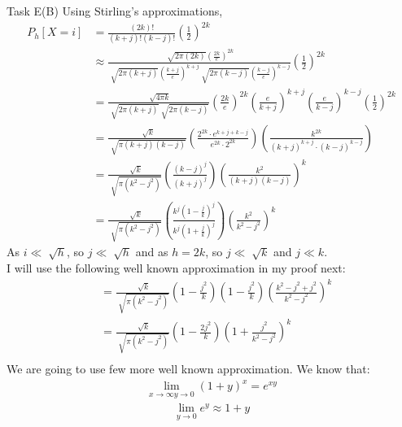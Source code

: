 \begin{task}{Task E(B)}
	Using Stirling's approximations,
	\begin{align}
		P_h[X=i] & = \frac{(2k)!}{(k+j)!(k-j)!}\left(\frac{1}{2}\right)^{2k} \\
		         & \approx
		\frac{\sqrt[]{2\pi(2k)}\left(\frac{2k}{e}\right)^{2k}}{\sqrt[]{2\pi(k+j)}\left(\frac{k+j}{e}\right)^{k+j}\sqrt[]{2\pi(k-j)}\left(\frac{k-j}{e}\right)^{k-j}}\left(\frac{1}{2}\right)^{2k}
		\\
		         & = \frac{\sqrt[]{4\pi k}}{\sqrt[]{2\pi
				(k+j)}\sqrt[]{2\pi (k-j)}}
		\left(\frac{2k}{e}\right)^{2k}\left(\frac{e}{k+j}\right)^{k+j}\left(\frac{e}{k-j}\right)^{k-j}\left(\frac{1}{2}\right)^{2k}
		\\
		         & = \frac{\sqrt[]{k}}{\sqrt[]{\pi
				(k+j)(k-j)}}\left(\frac{2^{2k}\cdot
			e^{k+j+k-j}}{e^{2k}\cdot2^{2k}}\right)
		\left(\frac{k^{2k}}{(k+j)^{k+j}\cdot
		(k-j)^{k-j}}\right)                                                  \\
		         & = \frac{\sqrt[]{k}}{\sqrt[]{\pi
				(k^2-j^2)}}\left(\frac{(k-j)^j}{(k+j)^j}\right)\left(\frac{k^2}{(k+j)(k-j)}\right)^k
		\\
		         & = \frac{\sqrt[]{k}}{\sqrt[]{\pi
				(k^2-j^2)}}\left(\frac{k^j\left(1-\frac{j}{k}\right)^j}{k^j\left(1+\frac{j}{k}\right)^j}\right)\left(\frac{k^2}{k^2-j^2}\right)^k
	\end{align}
	As $i \ll \sqrt[]{h}$, so $j\ll \sqrt[]{h}$ and as $h=2k$, so $j\ll
		\sqrt[]{k}$ and $j\ll k$. \\
	I will use the following well known approximation in my proof next:
	\begin{align}
		[(1+x)^n \approx 1+nx
	\end{align}
	where $x$ is close to 0.
	\begin{align}
		P_h[X=i] & = \frac{\sqrt[]{k}}{\sqrt[]{\pi
				(k^2-j^2)}}\left(1-\frac{j^2}{k}\right)\left(1-\frac{j^2}{k}\right)\left(\frac{k^2-j^2+j^2}{k^2-j^2}\right)^k
		\\
		         & = \frac{\sqrt[]{k}}{\sqrt[]{\pi
				(k^2-j^2)}}\left(1-\frac{2j^2}{k}\right)\left(1+\frac{j^2}{k^2-j^2}\right)^k
		\\
	\end{align}
	We are going to use few more well known approximation. We know that:
	\begin{align}
		\lim_{x\to \infty y\to 0} (1+y)^x = e^{xy}
	\end{align}
	\begin{align}
		\lim_{y\to 0}e^y \approx 1+y
	\end{align}

\end{task}
